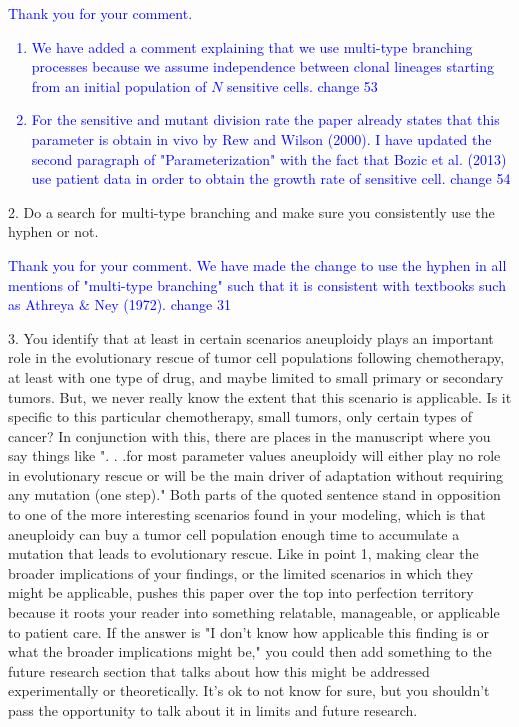 \documentclass[11pt,a4paper]{article}
\begin{document}
\textcolor{blue}{Thank you for your comment. 
\begin{enumerate}
\item We have added a comment explaining that we use multi-type branching processes because we assume independence between clonal lineages starting from an initial population of $N$ sensitive cells.   change 53 
\item For the sensitive and mutant division rate the paper already states that this parameter is obtain in vivo by Rew and Wilson (2000). I have updated the second paragraph  of "Parameterization" with the fact that Bozic et al. (2013) use patient data in order to obtain the growth rate of sensitive cell. change 54
\end{enumerate}
} 

2. Do a search for multi-type branching and make sure you consistently use the hyphen or not.

\textcolor{blue}{Thank you for your comment. We have made the change to use the hyphen in all mentions of "multi-type branching" such that it is consistent with textbooks such as Athreya $\&$ Ney (1972).  change 31} 

3. You identify that at least in certain scenarios aneuploidy plays an important role in the evolutionary rescue of tumor cell populations following chemotherapy, at least with one type of drug, and maybe limited to small primary or secondary tumors. But, we never really know the extent that this scenario is applicable. Is it specific to this particular chemotherapy, small tumors, only certain types of cancer? In conjunction with this, there are places in the manuscript where you say things like ". . .for most parameter values aneuploidy will either play no role in evolutionary rescue or will be the main driver of adaptation without requiring any mutation (one step)." Both parts of the quoted sentence stand in opposition to one of the more interesting scenarios found in your modeling, which is that aneuploidy can buy a tumor cell population enough time to accumulate a mutation that leads to evolutionary rescue. Like in point 1, making clear the broader implications of your findings, or the limited scenarios in which they might be applicable, pushes this paper over the top into perfection territory because it roots your reader into something relatable, manageable, or applicable to patient care. If the answer is "I don't know how applicable this finding is or what the broader implications might be," you could then add something to the future research section that talks about how this might be addressed experimentally or theoretically. It's ok to not know for sure, but you shouldn't pass the opportunity to talk about it in limits and future research.
\end{document}
